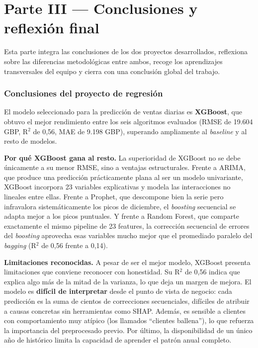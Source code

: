 \documentclass[11pt,a4paper]{article}
\begin{document}
\part*{\textcolor{azultfm}{Parte III — Conclusiones y reflexión final}}
\vspace{0.5cm}

Esta parte integra las conclusiones de los dos proyectos desarrollados, reflexiona sobre las diferencias metodológicas entre ambos, recoge los aprendizajes transversales del equipo y cierra con una conclusión global del trabajo.

\section{Conclusiones del proyecto de regresión}

El modelo seleccionado para la predicción de ventas diarias es \textbf{XGBoost}, que obtuvo el mejor rendimiento entre los seis algoritmos evaluados (RMSE de 19.604 GBP, R$^2$ de 0,56, MAE de 9.198 GBP), superando ampliamente al \textit{baseline} y al resto de modelos.

\textbf{Por qué XGBoost gana al resto.} La superioridad de XGBoost no se debe únicamente a su menor RMSE, sino a ventajas estructurales. Frente a ARIMA, que produce una predicción prácticamente plana al ser un modelo univariante, XGBoost incorpora 23 variables explicativas y modela las interacciones no lineales entre ellas. Frente a Prophet, que descompone bien la serie pero infravalora sistemáticamente los picos de diciembre, el \textit{boosting} secuencial se adapta mejor a los picos puntuales. Y frente a Random Forest, que comparte exactamente el mismo pipeline de 23 features, la corrección secuencial de errores del \textit{boosting} aprovecha esas variables mucho mejor que el promediado paralelo del \textit{bagging} (R$^2$ de 0,56 frente a 0,14).

\textbf{Limitaciones reconocidas.} A pesar de ser el mejor modelo, XGBoost presenta limitaciones que conviene reconocer con honestidad. Su R$^2$ de 0,56 indica que explica algo más de la mitad de la varianza, lo que deja un margen de mejora. El modelo es \textbf{difícil de interpretar} desde el punto de vista de negocio: cada predicción es la suma de cientos de correcciones secuenciales, difíciles de atribuir a causas concretas sin herramientas como SHAP. Además, es sensible a clientes con comportamiento muy atípico (los llamados ``clientes ballena''), lo que refuerza la importancia del preprocesado previo. Por último, la disponibilidad de un único año de histórico limita la capacidad de aprender el patrón anual completo.
\end{document}
